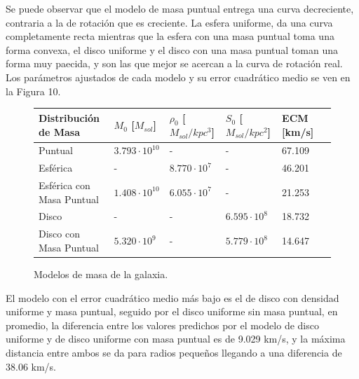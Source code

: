 \documentclass[letterpaper,oneside]{article}
\begin{document}
Se puede observar que el modelo de masa puntual entrega una curva decreciente, contraria a la de rotación que es creciente. La esfera uniforme, da una curva completamente recta mientras que la esfera con una masa puntual toma una forma convexa, el disco uniforme y el disco con una masa puntual toman una forma muy paecida, y son las que mejor se acercan a la curva de rotación real.\\

Los parámetros ajustados de cada modelo y su error cuadrático medio se ven en la Figura 10.

\begin{figure}
    \begin{tabular}{| l | l | l | l | l | l |}
     \hline
    Distribución de Masa     &  $M_0$ [$M_{sol}$] & $\rho_0$ [$M_{sol}/kpc^{3}$] & $S_0$ [$M_{sol}/kpc^{2}$] & ECM [km/s]\\ \hline
    Puntual 	              &	$3.793 \cdot 10^{10} $ & - & - & 67.109 	\\
    Esférica                  &	- & $8.770 \cdot 10^{7} $ & - & 46.201 	\\
    Esférica con Masa Puntual &	$1.408 \cdot 10^{10}$ & $6.055 \cdot 10^{7} $ & - & 21.253 \\
    Disco       	          & - & - &	$6.595 \cdot 10^{8} $ & 18.732	\\
    Disco con Masa Puntual    & $5.320 \cdot 10^{9}$	& - & $5.779 \cdot 10^{8}$  & 14.647\\ 
    \hline
    \end{tabular}
    \caption{Modelos de masa de la galaxia.}
\end{figure}

El modelo con el error cuadrático medio más bajo es el de disco con densidad uniforme y masa puntual, seguido por el disco uniforme sin masa puntual, en promedio, la diferencia entre los valores predichos por el modelo de disco uniforme y de disco uniforme con masa puntual es de 9.029 km/s, y la máxima distancia entre ambos se da para radios pequeños llegando a una diferencia de 38.06 km/s.
\end{document}
